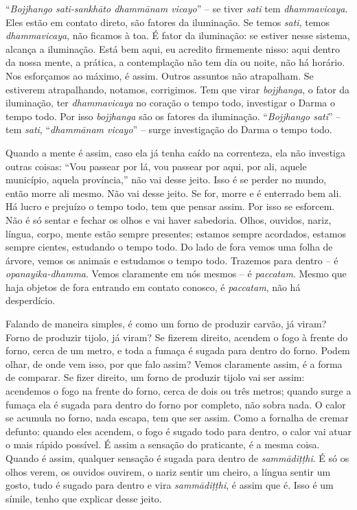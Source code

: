 “\textit{Bojjhango sati-sankhāto dhammānam vicayo}” – se tiver
\textit{sati} tem \textit{dhammavicaya.} Eles estão em contato direto,
são fatores da iluminação. Se temos \textit{sati}, temos
\textit{dhammavicaya}, não ficamos à toa. É fator da iluminação: se
estiver nesse sistema, alcança a iluminação. Está bem aqui, eu acredito
firmemente nisso: aqui dentro da nossa mente, a prática, a contemplação
não tem dia ou noite, não há horário. Nos esforçamos ao máximo, é
assim. Outros assuntos não atrapalham. Se estiverem atrapalhando,
notamos, corrigimos. Tem que virar \textit{bojjhanga}, o fator da
iluminação, ter \textit{dhammavicaya} no coração o tempo todo,
investigar o Darma o tempo todo. Por isso \textit{bojjhanga} são os
fatores da iluminação. “\textit{Bojjhango sati}” – tem \textit{sati},
“\textit{dhammānam vicayo}” – surge investigação do Darma o tempo
todo. 

Quando a mente é assim, caso ela já tenha caído na correnteza, ela
não investiga outras coisas: “Vou passear por lá, vou passear por aqui,
por ali, aquele município, aquela província,” não vai desse jeito. Isso
é se perder no mundo, então morre ali mesmo. Não vai desse jeito. Se
for, morre e é enterrado bem ali. Há lucro e prejuízo o tempo todo, tem
que pensar assim. Por isso se esforcem. Não é só sentar e fechar os
olhos e vai haver sabedoria. Olhos, ouvidos, nariz, língua, corpo,
mente estão sempre presentes; estamos sempre acordados, estamos sempre
cientes, estudando o tempo todo. Do lado de fora vemos uma folha de
árvore, vemos os animais e estudamos o tempo todo. Trazemos para dentro
– é \textit{opanayika-dhamma}. Vemos claramente em nós mesmos – é
\textit{paccatam}. Mesmo que haja objetos de fora entrando em contato
conosco, é \textit{paccatam}, não há desperdício. 

Falando de maneira simples, é como um forno de produzir carvão, já
viram? Forno de produzir tijolo, já viram? Se fizerem direito, acendem
o fogo à frente do forno, cerca de um metro, e toda a fumaça é sugada
para dentro do forno. Podem olhar, de onde vem isso, por que falo
assim? Vemos claramente assim, é a forma de comparar. Se fizer direito,
um forno de produzir tijolo vai ser assim: acendemos o fogo na frente
do forno, cerca de dois ou três metros; quando surge a fumaça ela é
sugada para dentro do forno por completo, não sobra nada. O calor se
acumula no forno, nada escapa, tem que ser assim. Como a fornalha de
cremar defunto: quando eles acendem, o fogo é sugado todo para dentro,
o calor vai atuar o mais rápido possível. É assim a sensação do
praticante, é a mesma coisa. Quando é assim, qualquer sensação é sugada
para dentro de \textit{sammādiṭṭhi}. É só os olhos verem, os ouvidos
ouvirem, o nariz sentir um cheiro, a língua sentir um gosto, tudo é
sugado para dentro e vira \textit{sammādiṭṭhi}, é assim que é. Isso é
um símile, tenho que explicar desse jeito.


